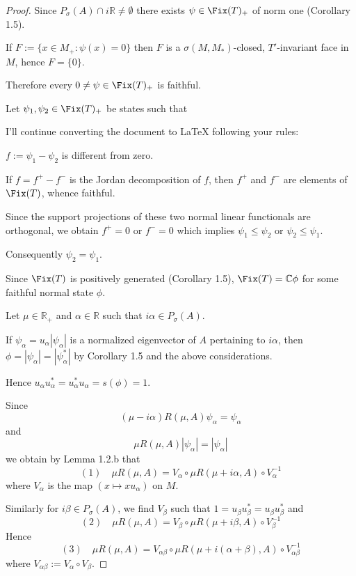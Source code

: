 \begin{proof}
Since $P_{\sigma}(A) \cap i\mathbb{R} \neq \emptyset$ there exists $\psi \in \Fix(T)_{+}$ of norm one (Corollary 1.5).

If $F := \{x \in M_{+} : \psi(x) = 0\}$ then $F$ is a $\sigma(M,M_{*})$-closed, $T'$-invariant face in $M$, hence $F = \{0\}$.

Therefore every $0 \neq \psi \in \Fix(T)_{+}$ is faithful.

Let $\psi_{1}, \psi_{2} \in \Fix(T)_{+}$ be states such that


I'll continue converting the document to LaTeX following your rules:

$f := \psi_{1} - \psi_{2}$ is different from zero.

If $f = f^{+} - f^{-}$ is the Jordan decomposition of $f$, then $f^{+}$ and $f^{-}$ are elements of $\Fix(T)$, whence faithful.

Since the support projections of these two normal linear functionals are orthogonal, we obtain $f^{+} = 0$ or $f^{-} = 0$ which implies $\psi_{1} \leq \psi_{2}$ or $\psi_{2} \leq \psi_{1}$.

Consequently $\psi_{2} = \psi_{1}$.

Since $\Fix(T)$ is positively generated (Corollary 1.5), $\Fix(T) = \mathbb{C}\phi$ for some faithful normal state $\phi$.

Let $\mu \in \mathbb{R}_{+}$ and $\alpha \in \mathbb{R}$ such that $i\alpha \in P_{\sigma}(A)$.

If $\psi_{\alpha} = u_{\alpha}|\psi_{\alpha}|$ is a normalized eigenvector of $A$ pertaining to $i\alpha$, then $\phi = |\psi_{\alpha}| = |\psi_{\alpha}^{*}|$ by Corollary 1.5 and the above considerations.

Hence $u_{\alpha}u_{\alpha}^{*} = u_{\alpha}^{*}u_{\alpha} = s(\phi) = 1$.

Since
\[
(\mu - i\alpha)R(\mu,A)\psi_{\alpha} = \psi_{\alpha}
\]
and
\[
\mu R(\mu,A)|\psi_{\alpha}| = |\psi_{\alpha}|
\]
we obtain by Lemma 1.2.b that
\[
(1) \quad \mu R(\mu,A) = V_{\alpha} \circ \mu R(\mu+i\alpha,A) \circ V_{\alpha}^{-1}
\]
where $V_{\alpha}$ is the map $(x \mapsto xu_{\alpha})$ on $M$.

Similarly for $i\beta \in P_{\sigma}(A)$, we find $V_{\beta}$ such that $1 = u_{\beta}u_{\beta}^{*} = u_{\beta}u_{\beta}^{*}$ and
\[
(2) \quad \mu R(\mu,A) = V_{\beta} \circ \mu R(\mu+i\beta,A) \circ V_{\beta}^{-1}
\]
Hence
\[
(3) \quad \mu R(\mu,A) = V_{\alpha\beta} \circ \mu R(\mu+i(\alpha+\beta),A) \circ V_{\alpha\beta}^{-1}
\]
where $V_{\alpha\beta} := V_{\alpha} \circ V_{\beta}$.


\end{proof}
